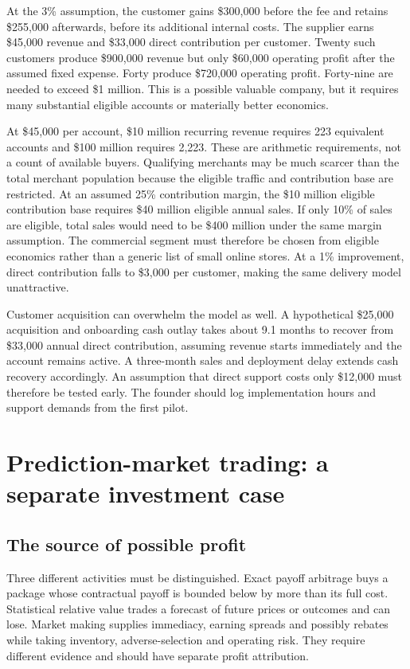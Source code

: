 \documentclass[11pt]{article}
\theoremstyle{remark}\newtheorem{example}{Example}
\begin{document}
At the 3\% assumption, the customer gains \$300,000 before the fee and retains
\$255,000 afterwards, before its additional internal costs. The supplier earns
\$45,000 revenue and \$33,000 direct contribution per customer. Twenty such
customers produce \$900,000 revenue but only \$60,000 operating profit after
the assumed fixed expense. Forty produce \$720,000 operating profit. Forty-nine
are needed to exceed \$1 million. This is a possible valuable company, but it
requires many substantial eligible accounts or materially better economics.

At \$45,000 per account, \$10 million recurring revenue requires 223 equivalent
accounts and \$100 million requires 2,223. These are arithmetic requirements,
not a count of available buyers. Qualifying merchants may be much scarcer than
the total merchant population because the eligible traffic and contribution
base are restricted. At an assumed 25\% contribution margin, the \$10 million
eligible contribution base requires \$40 million eligible annual sales. If only
10\% of sales are eligible, total sales would need to be \$400 million under
the same margin assumption. The commercial segment must therefore be chosen
from eligible economics rather than a generic list of small online stores.
At a 1\% improvement, direct contribution falls to
\$3,000 per customer, making the same delivery model unattractive.

Customer acquisition can overwhelm the model as well. A hypothetical \$25,000
acquisition and onboarding cash outlay takes about 9.1 months to recover from
\$33,000 annual direct contribution, assuming revenue starts immediately and
the account remains active. A three-month sales and deployment delay extends
cash recovery accordingly. An assumption that direct support costs only
\$12,000 must therefore be tested early. The founder should log implementation
hours and support demands from the first pilot.

\section{Prediction-market trading: a separate investment case}
\subsection{The source of possible profit}
Three different activities must be distinguished. Exact payoff arbitrage buys
a package whose contractual payoff is bounded below by more than its full
cost. Statistical relative value trades a forecast of future prices or outcomes
and can lose. Market making supplies immediacy, earning spreads and possibly
rebates while taking inventory, adverse-selection and operating risk.
They require different evidence and should have separate profit attribution.
\end{document}
